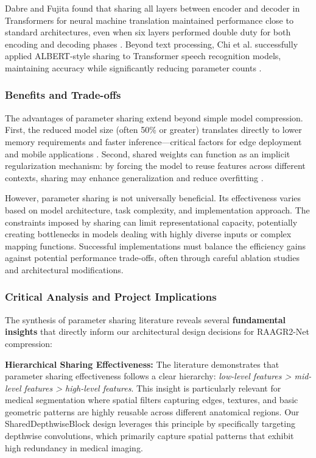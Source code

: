 \documentclass[12pt,a4paper]{article}
\begin{document}
Dabre and Fujita found that sharing all layers between encoder and decoder in Transformers for neural machine translation maintained performance close to standard architectures, even when six layers performed double duty for both encoding and decoding phases \cite{dabre2019}. Beyond text processing, Chi et al. successfully applied ALBERT-style sharing to Transformer speech recognition models, maintaining accuracy while significantly reducing parameter counts \cite{chi2021}.

\subsubsection{Benefits and Trade-offs}

The advantages of parameter sharing extend beyond simple model compression. First, the reduced model size (often 50\% or greater) translates directly to lower memory requirements and faster inference—critical factors for edge deployment and mobile applications \cite{howard2017, sandler2018}. Second, shared weights can function as an implicit regularization mechanism: by forcing the model to reuse features across different contexts, sharing may enhance generalization and reduce overfitting \cite{desai2024}.

However, parameter sharing is not universally beneficial. Its effectiveness varies based on model architecture, task complexity, and implementation approach. The constraints imposed by sharing can limit representational capacity, potentially creating bottlenecks in models dealing with highly diverse inputs or complex mapping functions. Successful implementations must balance the efficiency gains against potential performance trade-offs, often through careful ablation studies and architectural modifications.

\subsubsection{Critical Analysis and Project Implications}

The synthesis of parameter sharing literature reveals several \textbf{fundamental insights} that directly inform our architectural design decisions for RAAGR2-Net compression:

\textbf{Hierarchical Sharing Effectiveness:} The literature demonstrates that parameter sharing effectiveness follows a clear hierarchy: \textit{low-level features > mid-level features > high-level features}. This insight is particularly relevant for medical segmentation where spatial filters capturing edges, textures, and basic geometric patterns are highly reusable across different anatomical regions. Our SharedDepthwiseBlock design leverages this principle by specifically targeting depthwise convolutions, which primarily capture spatial patterns that exhibit high redundancy in medical imaging.
\end{document}
